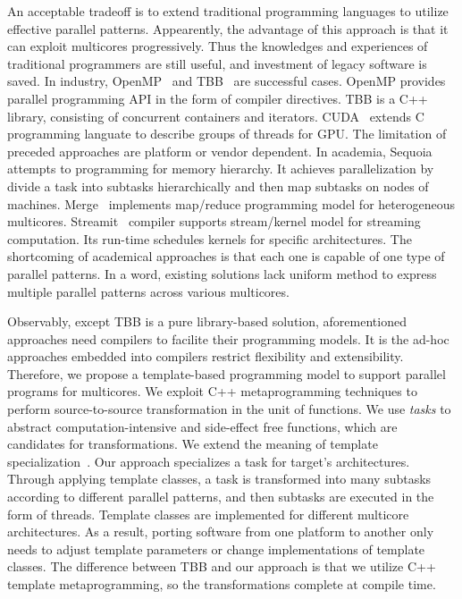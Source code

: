 An acceptable tradeoff is to extend traditional programming
languages to utilize effective parallel patterns. Appearently, the advantage of
this approach is that it can exploit multicores progressively. Thus the
knowledges and
experiences of traditional programmers are still useful, and investment
of legacy software is saved. In industry, OpenMP~\cite{openmp}  and
TBB~\cite{tbb} are successful cases. OpenMP provides parallel
programming API in the form of compiler directives. TBB is a C++ library, consisting of concurrent containers and
iterators. CUDA~\cite{cuda} extends C programming languate to describe
groups of threads for GPU. The limitation of preceded approaches are
platform or vendor dependent. In academia,
Sequoia~\cite{sequoia} attempts to programming for memory hierarchy. It
achieves parallelization by divide a task into subtasks hierarchically and then map
subtasks on nodes of machines. Merge~\cite{merge} implements
map/reduce programming model for heterogeneous
multicores. Streamit~\cite{ThiesKA02} compiler supports stream/kernel
model for streaming computation. Its run-time schedules kernels for specific architectures. The shortcoming of academical approaches is that each one
is capable of one type of parallel patterns.  In a word, existing solutions
lack uniform method to express multiple parallel patterns
across various multicores.


Observably, except TBB is a pure library-based solution, aforementioned
approaches need compilers to facilite their programming models. It is
the ad-hoc approaches embedded into compilers restrict flexibility and
extensibility. Therefore, we propose a template-based programming model to
support parallel programs for multicores. We exploit C++
metaprogramming techniques to perform source-to-source transformation
in the unit of functions. We use \emph{tasks} to abstract
computation-intensive and side-effect free functions, which are candidates for transformations. We extend the meaning of template
specialization~\cite{tcpl}. Our approach specializes a task for target's
architectures.  Through applying template classes, a task is
transformed into many subtasks according to different parallel
patterns, and then subtasks are executed in the form of threads.
Template classes are implemented for different multicore
architectures. As a result, porting software from one platform to another only
needs to adjust template parameters or change implementations of
template classes. The difference between TBB and our approach is that
we utilize C++ template metaprogramming, so the transformations complete
at compile time. 

